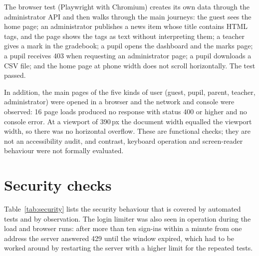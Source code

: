 The browser test (Playwright with Chromium) creates its own data through the administrator API and then walks through the main journeys: the guest sees the home page; an administrator publishes a news item whose title contains HTML tags, and the page shows the tags as text without interpreting them; a teacher gives a mark in the gradebook; a pupil opens the dashboard and the marks page; a pupil receives 403 when requesting an administrator page; a pupil downloads a CSV file; and the home page at phone width does not scroll horizontally. The test passed.

In addition, the main pages of the five kinds of user (guest, pupil, parent, teacher, administrator) were opened in a browser and the network and console were observed: 16 page loads produced no response with status 400 or higher and no console error. At a viewport of 390\,px the document width equalled the viewport width, so there was no horizontal overflow. These are functional checks; they are not an accessibility audit, and contrast, keyboard operation and screen-reader behaviour were not formally evaluated.

\section{Security checks}

Table~\ref{tab:security} lists the security behaviour that is covered by automated tests and by observation. The login limiter was also seen in operation during the load and browser runs: after more than ten sign-ins within a minute from one address the server answered 429 until the window expired, which had to be worked around by restarting the server with a higher limit for the repeated tests.

